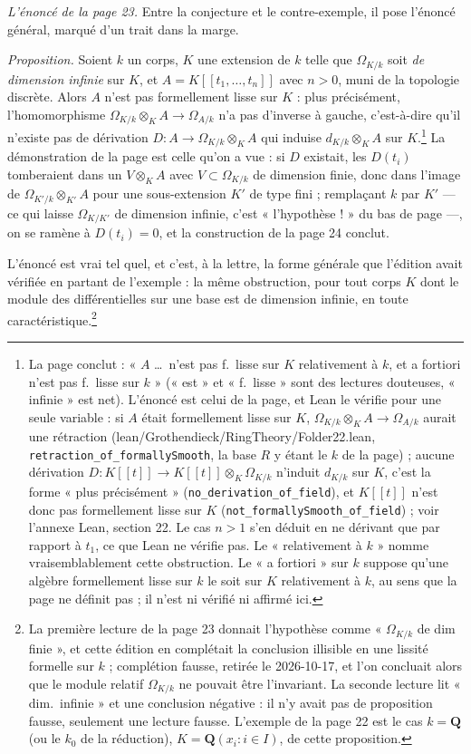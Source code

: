 \documentclass[11pt,a4paper]{article}
\begin{document}
\emph{L'énoncé de la page 23.} Entre la conjecture et le contre-exemple, il
pose l'énoncé général, marqué d'un trait dans la marge.

\emph{Proposition.} Soient $k$ un corps, $K$ une extension de $k$ telle que
$\Omega_{K/k}$ soit \emph{de dimension infinie} sur $K$, et
$A = K[[t_1, \ldots, t_n]]$ avec $n > 0$, muni de la topologie discrète. Alors
$A$ n'est pas formellement lisse sur $K$ : plus précisément, l'homomorphisme
$\Omega_{K/k} \otimes_K A \to \Omega_{A/k}$ n'a pas d'inverse à gauche,
c'est-à-dire qu'il n'existe pas de dérivation
$D : A \to \Omega_{K/k} \otimes_K A$ qui induise $d_{K/k} \otimes_K A$ sur
$K$.\footnote{La page conclut : « $A$ \ldots\ n'est pas f.\ lisse sur $K$
relativement à $k$, et a fortiori n'est pas f.\ lisse sur $k$ » (« est » et
« f.\ lisse » sont des lectures douteuses, « infinie » est net). L'énoncé
est celui de la page, et Lean le vérifie pour une seule variable : si $A$
était formellement lisse sur $K$, $\Omega_{K/k} \otimes_K A \to \Omega_{A/k}$
aurait une rétraction (lean/Grothendieck/RingTheory/Folder22.lean,
\texttt{retraction\_of\_formallySmooth}, la base $R$ y étant le $k$ de la
page) ; aucune dérivation $D : K[[t]] \to K[[t]] \otimes_K \Omega_{K/k}$
n'induit $d_{K/k}$ sur $K$, c'est la forme « plus précisément »
(\texttt{no\_derivation\_of\_field}), et $K[[t]]$ n'est donc pas
formellement lisse sur $K$ (\texttt{not\_formallySmooth\_of\_field}) ; voir
l'annexe Lean, section 22. Le cas $n > 1$ s'en déduit en ne dérivant que par
rapport à $t_1$, ce que Lean ne vérifie pas. Le « relativement à $k$ » nomme vraisemblablement cette obstruction. Le
« a fortiori » sur $k$ suppose qu'une algèbre formellement lisse sur $k$ le
soit sur $K$ relativement à $k$, au sens que la page ne définit pas ; il n'est
ni vérifié ni affirmé ici.} La démonstration de la page est celle qu'on a vue :
si $D$ existait, les $D(t_i)$ tomberaient dans un $V \otimes_K A$ avec
$V \subset \Omega_{K/k}$ de dimension finie, donc dans l'image de
$\Omega_{K'/k} \otimes_{K'} A$ pour une sous-extension $K'$ de type fini ;
remplaçant $k$ par $K'$ — ce qui laisse $\Omega_{K/K'}$ de dimension infinie,
c'est « l'hypothèse ! » du bas de page —, on se ramène à $D(t_i) = 0$, et la
construction de la page 24 conclut.

L'énoncé est vrai tel quel, et c'est, à la lettre, la forme générale que
l'édition avait vérifiée en partant de l'exemple : la même obstruction, pour
tout corps $K$ dont le module des différentielles sur une base est de
dimension infinie, en toute caractéristique.\footnote{La première lecture de
la page 23 donnait l'hypothèse comme « $\Omega_{K/k}$ de dim finie », et
cette édition en complétait la conclusion illisible en une lissité formelle
sur $k$ ; complétion fausse, retirée le 2026-10-17, et l'on concluait alors
que le module relatif $\Omega_{K/k}$ ne pouvait être l'invariant. La seconde
lecture lit « dim.\ infinie » et une conclusion négative : il n'y avait pas de
proposition fausse, seulement une lecture fausse. L'exemple de la page 22 est
le cas $k = \mathbf{Q}$ (ou le $k_0$ de la réduction), $K = \mathbf{Q}(x_i :
i \in I)$, de cette proposition.}
\end{document}
